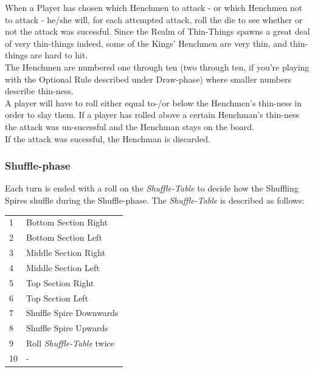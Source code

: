 \documentclass[11pt]{article} %
\begin{document}
\noindent
When a Player has chosen which Henchmen to attack - or which Henchmen not to attack - he/she will, for each attempted attack, roll the die to see whether or not the attack was sucessful. Since the Realm of Thin-Things spawns a great deal of very thin-things indeed, some of the Kings' Henchmen are very thin, and thin-things are hard to hit. \\
The Henchmen are numbered one through ten (two through ten, if you're playing with the Optional Rule described under Draw-phase) where smaller numbers describe thin-ness. \\
A player will have to roll either equal to-/or below the Henchmen's thin-ness in order to slay them. If a player has rolled above a certain Henchman's thin-ness the attack was un-sucessful and the Henchman stays on the board. \\
If the attack was sucessful, the Henchman is discarded.


\subsubsection{Shuffle-phase}
Each turn is ended with a roll on the \textit{Shuffle-Table} to decide how the Shuffling Spires shuffle during the Shuffle-phase. The \textit{Shuffle-Table} is described as follows: \\

\begin{tabular}{ l l }
1 & Bottom Section Right \\
2 & Bottom Section Left \\
3 & Middle Section Right \\
4 & Middle Section Left \\
5 & Top Section Right \\
6 & Top Section Left \\
7 & Shuffle Spire Downwards\\
8 & Shuffle Spire Upwards \\
9 &  Roll \textit{Shuffle-Table} twice\\
10 & - \\
\end{tabular}
\end{document}
